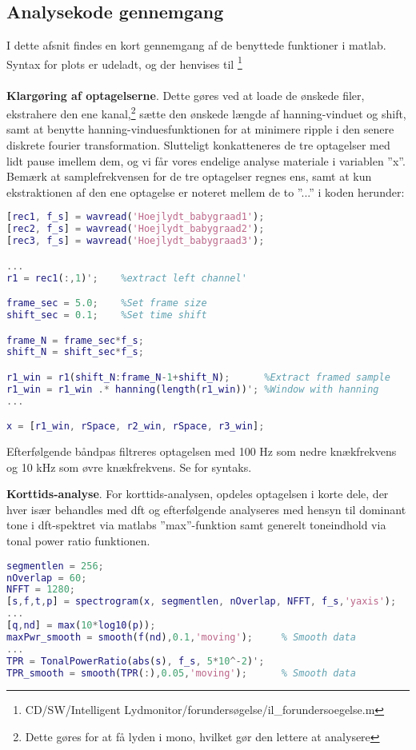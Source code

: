 \subsection*{Analysekode gennemgang}
I dette afsnit findes en kort gennemgang af de benyttede funktioner i matlab. Syntax for plots er udeladt, og der henvises til \citep{cd}\footnote{CD/SW/Intelligent Lydmonitor/forundersøgelse/il\_forundersoegelse.m} \\
\\
\textbf{Klargøring af optagelserne}. Dette gøres ved at loade de ønskede filer, ekstrahere den ene kanal,\footnote{Dette gøres for at få lyden i mono, hvilket gør den lettere at analysere} sætte den ønskede længde af hanning-vinduet og shift, samt at benytte hanning-vinduesfunktionen for at minimere ripple i den senere diskrete fourier transformation. Slutteligt konkatteneres de tre optagelser med lidt pause imellem dem, og vi får vores endelige analyse materiale i variablen ''x''. Bemærk at samplefrekvensen for de tre optagelser regnes ens, samt at kun ekstraktionen af den ene optagelse er noteret mellem de to ''...'' i koden herunder:
\begin{lstlisting}[language=Matlab]
%**** EXTRACT SAMPLES *********************************************%
[rec1, f_s] = wavread('Hoejlydt_babygraad1');
[rec2, f_s] = wavread('Hoejlydt_babygraad2');
[rec3, f_s] = wavread('Hoejlydt_babygraad3');

...
r1 = rec1(:,1)';    %extract left channel'

frame_sec = 5.0;    %Set frame size
shift_sec = 0.1;    %Set time shift

frame_N = frame_sec*f_s;
shift_N = shift_sec*f_s;

r1_win = r1(shift_N:frame_N-1+shift_N);      %Extract framed sample
r1_win = r1_win .* hanning(length(r1_win))'; %Window with hanning
...

x = [r1_win, rSpace, r2_win, rSpace, r3_win];
\end{lstlisting}

Efterfølgende båndpas filtreres optagelsen med 100 Hz som nedre knækfrekvens og 10 kHz som øvre knækfrekvens. Se \citep[SW/Intelligent Lydmonitor/forundersøgelse/il\_forundersoegelse.m]{cd} for syntaks.

\textbf{Korttids-analyse}. For korttids-analysen, opdeles optagelsen i korte dele, der hver især behandles med dft og efterfølgende analyseres med hensyn til dominant tone i dft-spektret via matlabs ''max''-funktion samt generelt toneindhold via tonal power ratio funktionen.
\begin{lstlisting}[language=Matlab]
%**** SHORT-TIME DFT (Spectogram) *********************************%
segmentlen = 256;
nOverlap = 60;
NFFT = 1280;
[s,f,t,p] = spectrogram(x, segmentlen, nOverlap, NFFT, f_s,'yaxis'); 
...
[q,nd] = max(10*log10(p)); 
maxPwr_smooth = smooth(f(nd),0.1,'moving');     % Smooth data
...
TPR = TonalPowerRatio(abs(s), f_s, 5*10^-2)';
TPR_smooth = smooth(TPR(:),0.05,'moving');      % Smooth data
\end{lstlisting}

